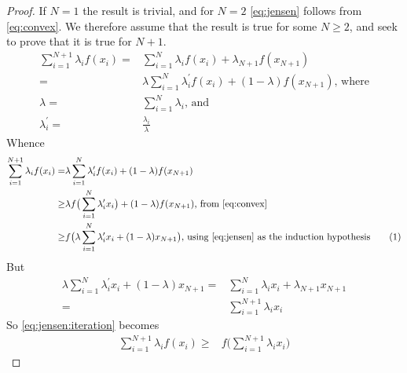 \documentclass[]{article}
\newcommand\numberthis    {\addtocounter{equation}{1}\tag{\theequation}}
\begin{document}
\begin{proof}
	If $N=1$ the result is trivial, and for $N=2$ \eqref{eq:jensen} follows from \eqref{eq:convex}. We therefore assume that the result is true for some $N\ge2$, and seek to prove that it is true for $N+1$.
	\begin{align*}
		\sum_{i=1}^{N+1}\lambda_i f(x_i) =& \sum_{i=1}^{N}\lambda_i f(x_i) + \lambda_{N+1} f(x_{N+1})\\
		=& \lambda \sum_{i=1}^{N}\lambda^\prime_i f(x_i) + (1-\lambda) f(x_{N+1}) \text{, where}\\
		\lambda =& \sum_{i=1}^{N}\lambda_i \text{, and}\\
		\lambda^\prime_i =& \frac{\lambda_i}{\lambda}
	\end{align*}
	Whence
	\begin{align*}
		\sum_{i=1}^{N+1}\lambda_i f(x_i) =& \lambda \sum_{i=1}^{N}\lambda^\prime_i f(x_i) + (1-\lambda) f(x_{N+1}) \\
		\ge& \lambda f\big(\sum_{i=1}^{N} \lambda^{\prime}_i x_i\big) + (1-\lambda) f(x_{N+1}) \text{, from \eqref{eq:convex}}\\
		\ge & f\big(\lambda \sum_{i=1}^{N} \lambda^{\prime}_i x_i + (1-\lambda) x_{N+1}\big) \text{, using \eqref{eq:jensen} as the induction hypothesis} \numberthis \label{eq:jensen:iteration}
	\end{align*} 
	But
	\begin{align*}
		\lambda \sum_{i=1}^{N} \lambda^{\prime}_i x_i + (1-\lambda) x_{N+1} =& \sum_{i=1}^{N} \lambda_i x_i + \lambda_{N+1}x_{N+1} \\
		=& \sum_{i=1}^{N+1} \lambda_i x_i
	\end{align*}
	So \eqref{eq:jensen:iteration} becomes
	\begin{align*}
		\sum_{i=1}^{N+1}\lambda_i f(x_i) \ge& f\big(\sum_{i=1}^{N+1} \lambda_i x_i\big)
	\end{align*}
\end{proof}
\end{document}
